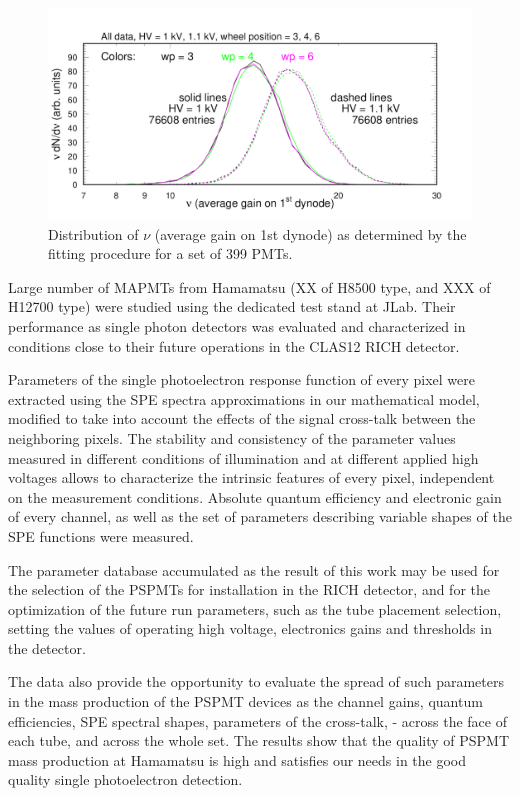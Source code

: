 \begin{figure}
	\centering
	\includegraphics[width=0.95\linewidth, trim={0mm 0mm 0mm 19mm}, clip]{figures/pglobal_nu.pdf}
	\caption{Distribution of $\nu$ (average gain on 1st dynode) as determined by the fitting procedure for a set of 399 PMTs.}
	\label{fig:pglobal_nu}
\end{figure}




Large number of MAPMTs from Hamamatsu (XX of H8500 type, and XXX of H12700 type) were studied using the dedicated test stand at JLab. Their performance as single photon detectors was evaluated and characterized in conditions close to their future operations in the CLAS12 RICH detector.


Parameters of the single photoelectron response function of every pixel were extracted using the SPE spectra approximations in our mathematical model, modified to take into account the effects of the signal cross-talk between the neighboring pixels. The stability and consistency of the parameter values measured in different conditions of illumination and at different applied high voltages allows to characterize the intrinsic features of every pixel, independent on the measurement conditions. Absolute quantum efficiency and electronic gain of every channel, as well as the set of parameters describing variable shapes of the SPE functions were measured.


The parameter database accumulated as the result of this work may be used for the selection of the PSPMTs for installation in the RICH detector, and for the optimization of the future run parameters, such as the tube placement selection, setting the values of operating high voltage, electronics gains and thresholds in the detector.


The data also provide the opportunity to evaluate the spread of such parameters in the mass production of the PSPMT devices as the channel gains, quantum efficiencies, SPE spectral shapes, parameters of the cross-talk, - across the face of each tube, and across the whole set. The results show that the quality of PSPMT mass production at Hamamatsu is high and satisfies our needs in the good quality single photoelectron detection.


